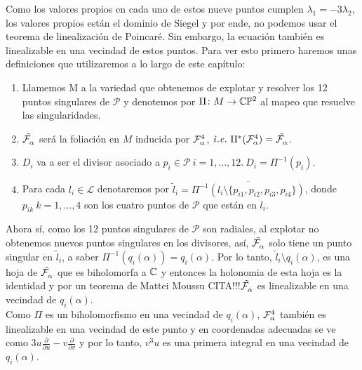 Como los valores propios en cada uno de estos nueve puntos cumplen $\lambda_{1} = -3\lambda_{2}$, los valores propios están el dominio de Siegel y por ende, no podemos usar el teorema de linealización de Poincaré. Sin embargo, la ecuación también es linealizable en una vecindad de estos puntos. Para ver esto primero haremos unas definiciones que utilizaremos a lo largo de este capítulo:

\begin{Not}
\label{Notimp}
\begin{enumerate}

\*

\item Llamemos M a la variedad que obtenemos de explotar y resolver los 12 puntos singulares de $\mathcal{P}$ y denotemos por $\Pi\colon M \rightarrow \CP$ al mapeo que resuelve las singularidades.

\item $\tilde{\Fol{\alpha}}$ será la foliación en $M$ inducida por $\Fol[4]{\alpha}$,  $\mathit{i.e.} \ \Pi^{*}(\Fol[4]{\alpha}) = \tilde{\Fol{\alpha}}$.

\item $D_{i}$ va a ser el divisor asociado a $p_{i} \in \mathcal{P} \ i=1,...,12. \ D_{i} = \Pi^{-1}(p_{i})$.

\item Para cada $l_{i} \in \mathcal{L}$ denotaremos por $\tilde{l}_{i} = \overline{\Pi^{-1}(l_{i} \setminus \{p_{i1}, p_{i2}, p_{i3}, p_{i4} \})}$, donde $p_{ik} \ k=1,...,4$ son los cuatro puntos de $\mathcal{P}$ que están en $l_{i}$.

\end{enumerate}
\end{Not}
Ahora sí, como los 12 puntos singulares de $\mathcal{P}$ son radiales, al explotar no obtenemos nuevos puntos singulares en los divisores, así, $\tilde{\Fol{\alpha}}$ solo tiene un punto singular en $\tilde{l}_{i}$, a saber $\Pi^{-1}(q_{i}(\alpha)) = q_{i}(\alpha)$. Por lo tanto, $\tilde{l}_{i}\setminus q_{i}(\alpha)$, es una hoja de $\tilde{\Fol{\alpha}}$ que es biholomorfa a $\C$ y entonces la holonomia de esta hoja es la identidad y por un teorema de Mattei Moussu CITA!!!$\tilde{\Fol{\alpha}}$ es linealizable en una vecindad de $q_{i}(\alpha)$.
\\

Como $\Pi$ es un biholomorfismo en una vecindad de $q_{i}(\alpha)$, $\Fol[4]{\alpha}$ también es linealizable en una vecindad de este punto y en coordenadas adecuadas se ve como $3u\frac{\partial}{\partial u} - v\frac{\partial}{\partial v}$ y por lo tanto, $v^{3}u$ es una primera integral en una vecindad de $q_{i}(\alpha)$.
\\

